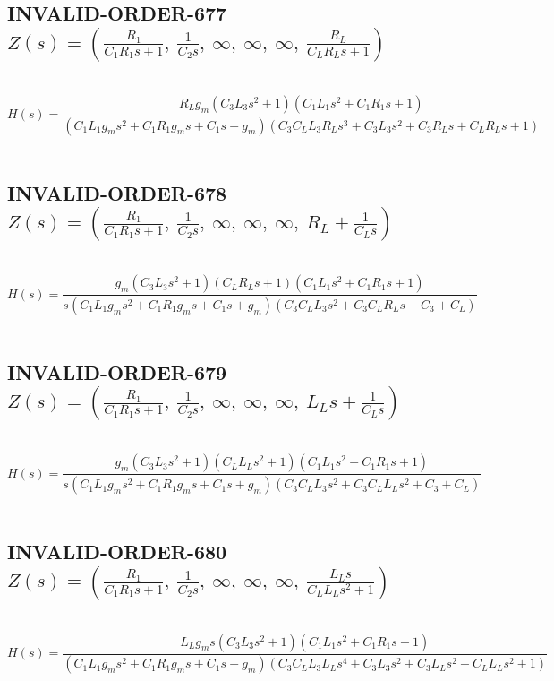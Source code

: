 \documentclass{article}
\begin{document}
\subsection{INVALID-ORDER-677 $Z(s) = \left( \frac{R_{1}}{C_{1} R_{1} s + 1}, \  \frac{1}{C_{2} s}, \  \infty, \  \infty, \  \infty, \  \frac{R_{L}}{C_{L} R_{L} s + 1}\right)$ } \ 
\textbf{\[H(s) = \frac{R_{L} g_{m} \left(C_{3} L_{3} s^{2} + 1\right) \left(C_{1} L_{1} s^{2} + C_{1} R_{1} s + 1\right)}{\left(C_{1} L_{1} g_{m} s^{2} + C_{1} R_{1} g_{m} s + C_{1} s + g_{m}\right) \left(C_{3} C_{L} L_{3} R_{L} s^{3} + C_{3} L_{3} s^{2} + C_{3} R_{L} s + C_{L} R_{L} s + 1\right)}\] } \ 
\subsection{INVALID-ORDER-678 $Z(s) = \left( \frac{R_{1}}{C_{1} R_{1} s + 1}, \  \frac{1}{C_{2} s}, \  \infty, \  \infty, \  \infty, \  R_{L} + \frac{1}{C_{L} s}\right)$ } \ 
\textbf{\[H(s) = \frac{g_{m} \left(C_{3} L_{3} s^{2} + 1\right) \left(C_{L} R_{L} s + 1\right) \left(C_{1} L_{1} s^{2} + C_{1} R_{1} s + 1\right)}{s \left(C_{1} L_{1} g_{m} s^{2} + C_{1} R_{1} g_{m} s + C_{1} s + g_{m}\right) \left(C_{3} C_{L} L_{3} s^{2} + C_{3} C_{L} R_{L} s + C_{3} + C_{L}\right)}\] } \ 
\subsection{INVALID-ORDER-679 $Z(s) = \left( \frac{R_{1}}{C_{1} R_{1} s + 1}, \  \frac{1}{C_{2} s}, \  \infty, \  \infty, \  \infty, \  L_{L} s + \frac{1}{C_{L} s}\right)$ } \ 
\textbf{\[H(s) = \frac{g_{m} \left(C_{3} L_{3} s^{2} + 1\right) \left(C_{L} L_{L} s^{2} + 1\right) \left(C_{1} L_{1} s^{2} + C_{1} R_{1} s + 1\right)}{s \left(C_{1} L_{1} g_{m} s^{2} + C_{1} R_{1} g_{m} s + C_{1} s + g_{m}\right) \left(C_{3} C_{L} L_{3} s^{2} + C_{3} C_{L} L_{L} s^{2} + C_{3} + C_{L}\right)}\] } \ 
\subsection{INVALID-ORDER-680 $Z(s) = \left( \frac{R_{1}}{C_{1} R_{1} s + 1}, \  \frac{1}{C_{2} s}, \  \infty, \  \infty, \  \infty, \  \frac{L_{L} s}{C_{L} L_{L} s^{2} + 1}\right)$ } \ 
\textbf{\[H(s) = \frac{L_{L} g_{m} s \left(C_{3} L_{3} s^{2} + 1\right) \left(C_{1} L_{1} s^{2} + C_{1} R_{1} s + 1\right)}{\left(C_{1} L_{1} g_{m} s^{2} + C_{1} R_{1} g_{m} s + C_{1} s + g_{m}\right) \left(C_{3} C_{L} L_{3} L_{L} s^{4} + C_{3} L_{3} s^{2} + C_{3} L_{L} s^{2} + C_{L} L_{L} s^{2} + 1\right)}\] } \ 
\end{document}
